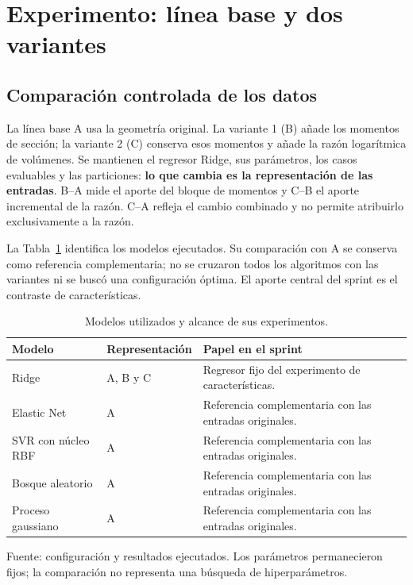 \section{Experimento: línea base y dos variantes}
\label{sec:diseno}
\subsection{Comparación controlada de los datos}
La línea base A usa la geometría original. La variante 1 (B) añade los momentos de sección; la variante 2 (C) conserva esos momentos y añade la razón logarítmica de volúmenes. Se mantienen el regresor Ridge, sus parámetros, los casos evaluables y las particiones: \textbf{lo que cambia es la representación de las entradas}. B--A mide el aporte del bloque de momentos y C--B el aporte incremental de la razón. C--A refleja el cambio combinado y no permite atribuirlo exclusivamente a la razón.

La Tabla~\ref{tab:modelos-usados} identifica los modelos ejecutados. Su comparación con A se conserva como referencia complementaria; no se cruzaron todos los algoritmos con las variantes ni se buscó una configuración óptima. El aporte central del sprint es el contraste de características.

\begin{table}[htbp]
\centering\small{}
\caption{Modelos utilizados y alcance de sus experimentos.}
\label{tab:modelos-usados}
\begin{tabularx}{\linewidth}{@{}l l X@{}}
\toprule
Modelo & Representación & Papel en el sprint \\
\midrule
Ridge & A, B y C & Regresor fijo del experimento de características. \\
Elastic Net & A & Referencia complementaria con las entradas originales. \\
SVR con núcleo RBF & A & Referencia complementaria con las entradas originales. \\
Bosque aleatorio & A & Referencia complementaria con las entradas originales. \\
Proceso gaussiano & A & Referencia complementaria con las entradas originales. \\
\bottomrule
\end{tabularx}
\par\smallskip\footnotesize Fuente: configuración y resultados ejecutados. Los parámetros permanecieron fijos; la comparación no representa una búsqueda de hiperparámetros.
\end{table}

